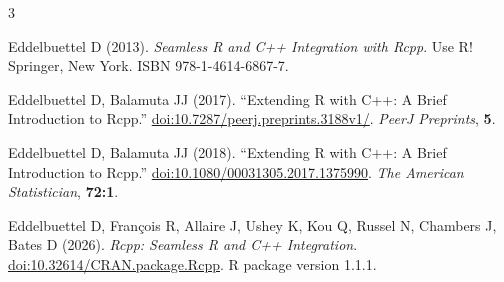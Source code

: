 \begin{thebibliography}{3}
\newcommand{\enquote}[1]{``#1''}
\providecommand{\natexlab}[1]{#1}
\providecommand{\url}[1]{\texttt{#1}}
\providecommand{\urlprefix}{URL }
\providecommand{\doi}[1]{doi:\discretionary{}{}{}#1}
\providecommand{\eprint}[2][]{\url{#2}}

Eddelbuettel D (2013).
\newblock \emph{Seamless R and C++ Integration with Rcpp}.
\newblock Use R! Springer, New York.
\newblock ISBN 978-1-4614-6867-7.

Eddelbuettel D, Balamuta JJ (2017).
\newblock \enquote{Extending R with C++: A Brief Introduction to Rcpp.}
\newblock \href{https://peerj.com/preprints/3188v1/}{doi:10.7287/peerj.preprints.3188v1/}.
\newblock \emph{PeerJ Preprints}, \textbf{5}.

Eddelbuettel D, Balamuta JJ (2018).
\newblock \enquote{Extending R with C++: A Brief Introduction to Rcpp.}
\newblock \href{https://www.tandfonline.com/doi/full/10.1080/00031305.2017.1375990}{doi:10.1080/00031305.2017.1375990}.
\newblock \emph{The American Statistician}, \textbf{72:1}.

Eddelbuettel D, Fran\c{c}ois R, Allaire J, Ushey K, Kou Q, Russel N, Chambers
  J, Bates D (2026).
\newblock \emph{{Rcpp}: Seamless {R} and {C++} Integration}.
\newblock \href{https://CRAN.R-Project.org/package=Rcpp}{doi:10.32614/CRAN.package.Rcpp}.
\newblock R package version 1.1.1.
\end{thebibliography}
